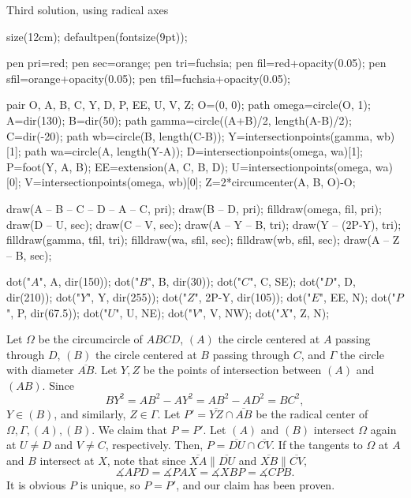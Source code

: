 \begin{customenv}{Third solution, using radical axes}\ 
    \begin{center}
        \begin{asy}
            size(12cm);
            defaultpen(fontsize(9pt));

            pen pri=red;
            pen sec=orange;
            pen tri=fuchsia;
            pen fil=red+opacity(0.05);
            pen sfil=orange+opacity(0.05);
            pen tfil=fuchsia+opacity(0.05);

            pair O, A, B, C, Y, D, P, EE, U, V, Z;
            O=(0, 0);
            path omega=circle(O, 1);
            A=dir(130);
            B=dir(50);
            path gamma=circle((A+B)/2, length(A-B)/2);
            C=dir(-20);
            path wb=circle(B, length(C-B));
            Y=intersectionpoints(gamma, wb)[1];
            path wa=circle(A, length(Y-A));
            D=intersectionpoints(omega, wa)[1];
            P=foot(Y, A, B);
            EE=extension(A, C, B, D);
            U=intersectionpoints(omega, wa)[0];
            V=intersectionpoints(omega, wb)[0];
            Z=2*circumcenter(A, B, O)-O;

            draw(A -- B -- C -- D -- A -- C, pri); draw(B -- D, pri);
            filldraw(omega, fil, pri);
            draw(D -- U, sec); draw(C -- V, sec); draw(A -- Y -- B, tri); draw(Y -- (2P-Y), tri);
            filldraw(gamma, tfil, tri);
            filldraw(wa, sfil, sec); filldraw(wb, sfil, sec);
            draw(A -- Z -- B, sec);

            dot("$A$", A, dir(150));
            dot("$B$", B, dir(30));
            dot("$C$", C, SE);
            dot("$D$", D, dir(210));
            dot("$Y$", Y, dir(255));
            dot("$Z$", 2P-Y, dir(105));
            dot("$E$", EE, N);
            dot("$P$", P, dir(67.5));
            dot("$U$", U, NE);
            dot("$V$", V, NW);
            dot("$X$", Z, N);
        \end{asy}
    \end{center}
    Let $\Omega$ be the circumcircle of $ABCD$, $(A)$ the circle centered at $A$ passing through $D$, $(B)$ the circle centered at $B$ passing through $C$, and $\Gamma$ the circle with diameter $\overline{AB}$. Let $Y,Z$ be the points of intersection between $(A)$ and $(AB)$. Since \[BY^2=AB^2-AY^2=AB^2-AD^2=BC^2,\]
    $Y\in(B)$, and similarly, $Z\in\Gamma$. Let $P'=\overline{YZ}\cap\overline{AB}$ be the radical center of $\Omega,\Gamma,(A),(B)$. We claim that $P=P'$. Let $(A)$ and $(B)$ intersect $\Omega$ again at $U\ne D$ and $V\ne C$, respectively. Then, $P=\overline{DU}\cap\overline{CV}$. If the tangents to $\Omega$ at $A$ and $B$ intersect at $X$, note that since $\overline{XA}\parallel\overline{DU}$ and $\overline{XB}\parallel\overline{CV}$, \[\measuredangle APD=\measuredangle PAX=\measuredangle XBP=\measuredangle CPB.\]
    It is obvious $P$ is unique, so $P=P'$, and our claim has been proven.


\end{customenv}

